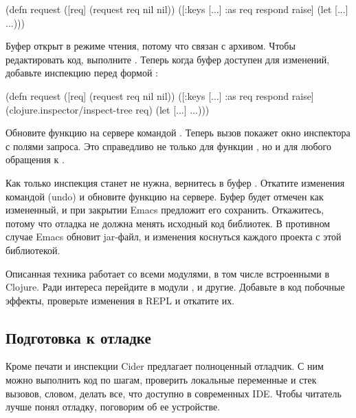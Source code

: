 \begin{english}
  \begin{clojure}
(defn request
  ([req]
   (request req nil nil))
  ([{:keys [...]
     :as req} respond raise]
   (let [...]
     ...)))
  \end{clojure}
\end{english}

Буфер  открыт в режиме чтения, потому что связан с архивом. Чтобы редактировать код, выполните . Теперь когда буфер доступен для изменений, добавьте инспекцию перед формой :

\begin{english}
  \begin{clojure}
(defn request
  ([req] (request req nil nil))
  ([{:keys [...]
     :as req} respond raise]
   (clojure.inspector/inspect-tree req)
   (let [...]
     ...)))
  \end{clojure}
\end{english}

Обновите функцию на сервере командой . Теперь вызов  покажет окно инспектора с полями запроса. Это справедливо не только для функции , но и для любого обращения к .

Как только инспекция станет не нужна, вернитесь в буфер . Откатите изменения командой  (undo) и обновите функцию на сервере. Буфер  будет отмечен как измененный, и при закрытии Emacs предложит его сохранить. Откажитесь, потому что отладка не должна менять исходный код библиотек. В противном случае Emacs обновит jar-файл, и изменения коснуться каждого проекта с этой библиотекой.

Описанная техника работает со всеми модулями, в том числе встроенными в Clojure. Ради интереса перейдите в модули ,  и другие. Добавьте в код побочные эффекты, проверьте изменения в REPL и откатите их.

\subsection{Подготовка к отладке}

Кроме печати и инспекции Cider предлагает полноценный отладчик. С ним можно выполнить код по шагам, проверить локальные переменные и стек вызовов, словом, делать все, что доступно в современных IDE. Чтобы читатель лучше понял отладку, поговорим об ее устройстве.

